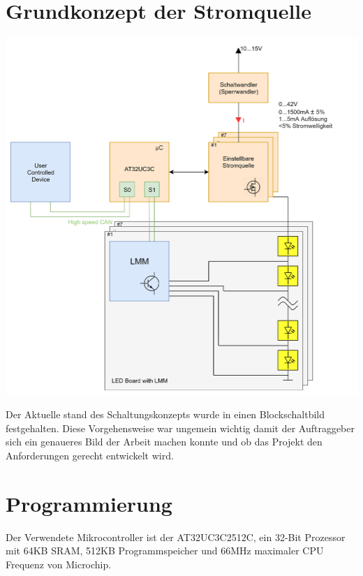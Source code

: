 \documentclass[paper=a4, 12pt]{scrreprt}
\begin{document}
	\section{Grundkonzept der Stromquelle}
	\begin{adjustbox}{center,caption={Grundkonzept der Stromquelle},label={fig:Grundkonzept},nofloat=figure,vspace=\bigskipamount}
		\includegraphics[height=\textwidth]{img/Diplomarbeit_Blockschaltbild.jpg}
		\hfill \break
	\end{adjustbox}
	Der Aktuelle stand des Schaltungskonzepts wurde in einen Blockschaltbild festgehalten.
	Diese Vorgehensweise war ungemein wichtig damit der Auftraggeber sich ein genaueres Bild der Arbeit machen konnte und ob das Projekt den Anforderungen gerecht entwickelt wird.
	\newpage
	
	\section{Programmierung}
	Der Verwendete Mikrocontroller ist der AT32UC3C2512C, ein 32-Bit Prozessor mit 64KB SRAM, 512KB Programmspeicher und 66MHz maximaler CPU Frequenz von Microchip.
	
\end{document}

